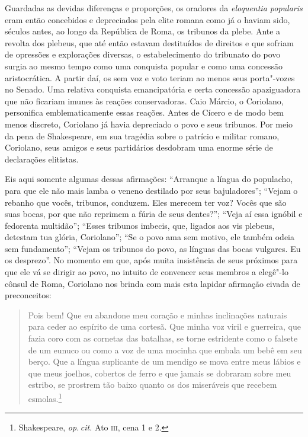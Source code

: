 Guardadas as devidas diferenças e proporções, os oradores da
\emph{eloquentia popularis} eram então concebidos e depreciados pela
elite romana como já o haviam sido, séculos antes, ao longo da República
de Roma, os tribunos da plebe. Ante a revolta dos plebeus, que até então
estavam destituídos de direitos e que sofriam de opressões e explorações
diversas, o estabelecimento do tribunato do povo surgia ao mesmo tempo
como uma conquista popular e como uma concessão aristocrática. A partir
daí, os sem voz e voto teriam ao menos seus porta"-vozes no Senado. Uma
relativa conquista emancipatória e certa concessão apaziguadora que não
ficariam imunes às reações conservadoras. Caio Márcio, o Coriolano,
personifica emblematicamente essas reações. Antes de Cícero e de modo
bem menos discreto, Coriolano já havia depreciado o povo e seus
tribunos. Por meio da pena de Shakespeare, em sua tragédia sobre o
patrício e militar romano, Coriolano, seus amigos e seus partidários
desdobram uma enorme série de declarações elitistas.

Eis aqui somente algumas dessas afirmações: ``Arranque a língua do
populacho, para que ele não mais lamba o veneno destilado por seus
bajuladores''; ``Vejam o rebanho que vocês, tribunos, conduzem. Eles
merecem ter voz? Vocês que são suas bocas, por que não reprimem a fúria
de seus dentes?''; ``Veja aí essa ignóbil e fedorenta multidão'';
``Esses tribunos imbecis, que, ligados aos vis plebeus, detestam tua
glória, Coriolano''; ``Se o povo ama sem motivo, ele também odeia sem
fundamento''; ``Vejam os tribunos do povo, as línguas das bocas
vulgares. Eu os desprezo''. No momento em que, após muita insistência de
seus próximos para que ele vá se dirigir ao povo, no intuito de
convencer seus membros a elegê"-lo cônsul de Roma, Coriolano nos brinda
com mais esta lapidar afirmação eivada de preconceitos:

\begin{quote}
Pois bem! Que eu abandone meu coração e minhas inclinações naturais para
ceder ao espírito de uma cortesã. Que minha voz viril e guerreira, que
fazia coro com as cornetas das batalhas, se torne estridente como o
falsete de um eunuco ou como a voz de uma mocinha que embala um bebê em
seu berço. Que a língua suplicante de um mendigo se mova entre meus
lábios e que meus joelhos, cobertos de ferro e que jamais se dobraram
sobre meu estribo, se prostrem tão baixo quanto os dos miseráveis que
recebem esmolas.\footnote{Shakespeare, \emph{op.\,cit.} Ato \textsc{iii}, cena 1
  e 2.}
\end{quote}

